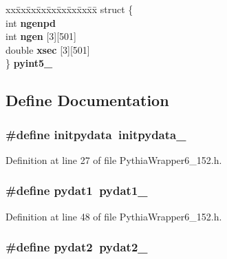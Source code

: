 \begin{CompactItemize}
\begin{tabbing}
\end{tabbing}\item 
\begin{tabbing}
xx\=xx\=xx\=xx\=xx\=xx\=xx\=xx\=xx\=\kill
struct \{\\
\>int {\bf ngenpd}\\
\>int {\bf ngen} [3][501]\\
\>double {\bf xsec} [3][501]\\
\} {\bf pyint5\_}\\

\end{tabbing}\end{CompactItemize}


\subsection{Define Documentation}
\subsubsection{\setlength{\rightskip}{0pt plus 5cm}\#define initpydata~initpydata\_\-}\label{PythiaWrapper6__152_8h_8f6480836f44533427a09e5f8f4150ad}




Definition at line 27 of file Pythia\-Wrapper6\_\-152.h.
\subsubsection{\setlength{\rightskip}{0pt plus 5cm}\#define pydat1~{\bf pydat1\_\-}}\label{PythiaWrapper6__152_8h_3ac349aace72ee0475915601b813a720}




Definition at line 48 of file Pythia\-Wrapper6\_\-152.h.
\subsubsection{\setlength{\rightskip}{0pt plus 5cm}\#define pydat2~{\bf pydat2\_\-}}\label{PythiaWrapper6__152_8h_4e4dd91838a9d45290e795630c1a4e01}




